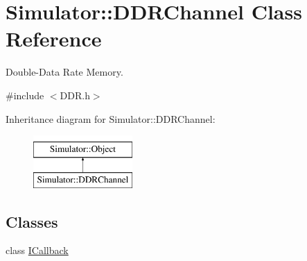 \hypertarget{class_simulator_1_1_d_d_r_channel}{\section{Simulator\+:\+:D\+D\+R\+Channel Class Reference}
\label{class_simulator_1_1_d_d_r_channel}
}


Double-\/\+Data Rate Memory.  




{\ttfamily \#include $<$D\+D\+R.\+h$>$}

Inheritance diagram for Simulator\+:\+:D\+D\+R\+Channel\+:\begin{figure}[H]
\begin{center}
\leavevmode
\includegraphics[height=2.000000cm]{class_simulator_1_1_d_d_r_channel}
\end{center}
\end{figure}
\subsection*{Classes}
\begin{DoxyCompactItemize}
\item 
class \hyperlink{class_simulator_1_1_d_d_r_channel_1_1_i_callback}{I\+Callback}
\end{DoxyCompactItemize}
